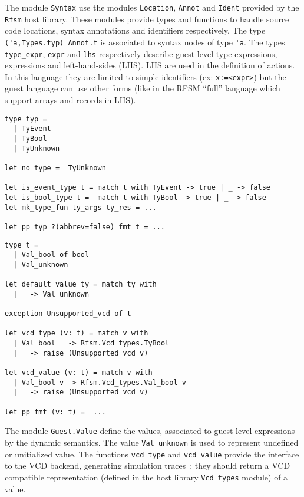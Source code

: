 The module \texttt{Syntax} use the modules \texttt{Location}, \texttt{Annot}  and \texttt{Ident}
provided by the \texttt{Rfsm} host library. These modules provide types and functions to handle
source code locations, syntax annotations and identifiers respectively. The type
\verb|('a,Types.typ) Annot.t| is associated to syntax nodes of type
\verb|'a|. The types \verb|type_expr|, \verb|expr| and \verb|lhs| respectively describe guest-level
type expressions, expressions and left-hand-sides (LHS). LHS are used in the definition of
actions. In this language they are limited to simple identifiers (ex: \verb|x:=<expr>|) but the
guest language can use other forms (like in the RFSM ``full'' language which support arrays and
records in LHS). 

\begin{lstlisting}[language={[Objective]Caml},frame=single,basicstyle=\small,caption={Module
    \texttt{Guest.Values} (excerpt)},label={lst:mini-value}]
type typ =
  | TyEvent
  | TyBool
  | TyUnknown

let no_type =  TyUnknown

let is_event_type t = match t with TyEvent -> true | _ -> false
let is_bool_type t =  match t with TyBool -> true | _ -> false
let mk_type_fun ty_args ty_res = ...

let pp_typ ?(abbrev=false) fmt t = ...
\end{lstlisting}

\begin{lstlisting}[language={[Objective]Caml},frame=single,basicstyle=\small,caption={Module
    \texttt{Guest.Value} (excerpt)},label={lst:mini-value}]
type t =
  | Val_bool of bool
  | Val_unknown

let default_value ty = match ty with
  | _ -> Val_unknown

exception Unsupported_vcd of t

let vcd_type (v: t) = match v with
  | Val_bool _ -> Rfsm.Vcd_types.TyBool
  | _ -> raise (Unsupported_vcd v)

let vcd_value (v: t) = match v with
  | Val_bool v -> Rfsm.Vcd_types.Val_bool v
  | _ -> raise (Unsupported_vcd v)

let pp fmt (v: t) =  ...
\end{lstlisting}

The module \verb|Guest.Value| define the values, associated to guest-level expressions by the
dynamic semantics. The value \verb|Val_unknown| is used to represent undefined or unitialized
value. The functions \verb|vcd_type| and \verb|vcd_value| provide the interface to the VCD backend,
generating simulation traces~: they should return a VCD compatible representation  (defined in the
host library \verb|Vcd_types| module) of a value.

